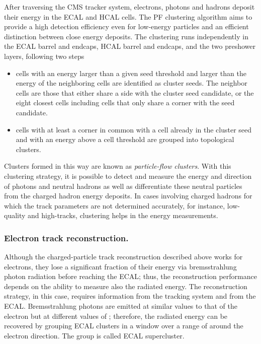 After traversing the CMS tracker system, electrons, photons and hadrons deposit their energy in the ECAL and HCAL cells. The PF clustering algorithm aims to provide a high detection efficiency even for low-energy particles and an efficient distinction between close energy deposits. The clustering runs independently in the ECAL barrel and endcaps, HCAL barrel and endcaps, and the two preshower layers, following two steps
\begin{itemize}
\item cells with an energy larger than a given seed threshold and larger than the energy of the neighboring cells are identified as cluster seeds. The neighbor cells are those that either share a side with the cluster seed candidate, or the eight closest cells including cells that only share a corner with the seed candidate.
\item cells with at least a corner in common with a cell already in the cluster seed and with an energy above a cell threshold are grouped into topological clusters.
\end{itemize}

Clusters formed in this way are known as \textit{particle-flow clusters}. With this clustering strategy, it is possible to detect and measure the energy and direction of photons and neutral hadrons as well as differentiate these neutral particles from the charged hadron energy deposits. In cases involving charged hadrons for which the track parameters are not determined accurately, for instance, low-quality and high-\pt tracks, clustering helps in the energy measurements. 

\subsubsection*{Electron track reconstruction.}

Although the charged-particle track reconstruction described above works for electrons, they lose a significant fraction of their energy via bremsstrahlung photon radiation before reaching the ECAL; thus, the reconstruction performance depends on the ability to measure also the radiated energy. The reconstruction strategy, in this case, requires information from the tracking system and from the ECAL. Bremsstrahlung photons are emitted at similar \etac values to that of the electron but at different values of \phic; therefore, the radiated energy can be recovered by grouping ECAL clusters in a \etac window over a range of \phic around the electron direction. The group is called ECAL supercluster.

